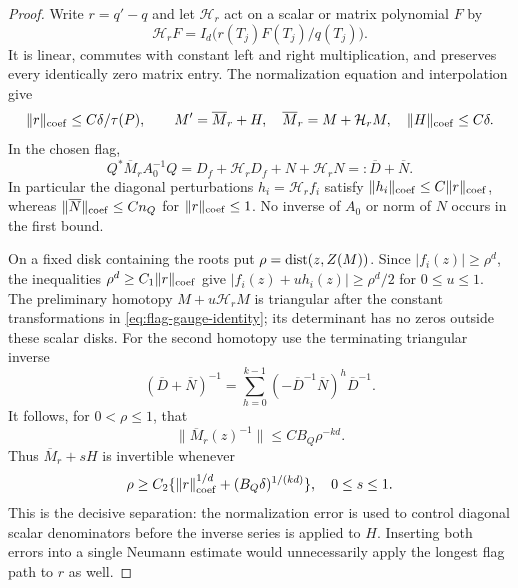 \begin{proof}
Write $r=q'-q$ and let $\mathcal H_r$ act on a scalar or matrix
polynomial $F$ by
\[
 \mathcal H_rF=I_d\big(r(T_j)F(T_j)/q(T_j)\big).
\]
It is linear, commutes with constant left and right multiplication,
and preserves every identically zero matrix entry. The normalization
equation and interpolation give
\begin{equation}\label{eq:flag-error-split}
 \|r\|_{\rm coef}\le C\delta/\tau(P),\qquad
 M'=\overline M_r+H,\quad
 \overline M_r=M+\mathcal H_rM,\quad
 \|H\|_{\rm coef}\le C\delta.
\end{equation}
In the chosen flag,
\begin{equation}\label{eq:flag-gauge-identity}
 Q^*\overline M_r A_0^{-1}Q
    =D_f+\mathcal H_rD_f+N+\mathcal H_rN
    =:\overline D+\overline N.
\end{equation}
In particular the diagonal perturbations
$h_i=\mathcal H_rf_i$ satisfy $\|h_i\|_{\rm coef}\le C\|r\|_{\rm coef}$,
whereas $\|\overline N\|_{\rm coef}\le Cn_Q$ for $\|r\|_{\rm coef}\le1$.
No inverse of $A_0$ or norm of $N$ occurs in the first bound.

On a fixed disk containing the roots put $\rho=\operatorname{dist}(z,Z(M))$.
Since $|f_i(z)|\ge\rho^d$, the inequalities
$\rho^d\ge C_1\|r\|_{\rm coef}$ give
$|f_i(z)+u h_i(z)|\ge\rho^d/2$ for $0\le u\le1$.
The preliminary homotopy $M+u\mathcal H_rM$ is triangular after the
constant transformations in \eqref{eq:flag-gauge-identity}; its
determinant has no zeros outside these scalar disks.
For the second homotopy use the terminating triangular inverse
\begin{equation}\label{eq:flag-inverse-series}
 (\overline D+\overline N)^{-1}
       =\sum_{h=0}^{k-1}(-\overline D^{-1}\overline N)^h
                                             \overline D^{-1}.
\end{equation}
It follows, for $0<\rho\le1$, that
\[
 \|\overline M_r(z)^{-1}\|\le CB_Q\rho^{-kd}.
\]
Thus $\overline M_r+sH$ is invertible whenever
\[
 \rho\ge C_2\{\|r\|_{\rm coef}^{1/d}
                                  +(B_Q\delta)^{1/(kd)}\},\quad 0\le s\le1.
\]
This is the decisive separation: the normalization error is used to
control diagonal scalar denominators before the inverse series is
applied to $H$. Inserting both errors into a single Neumann estimate
would unnecessarily apply the longest flag path to $r$ as well.


\end{proof}

